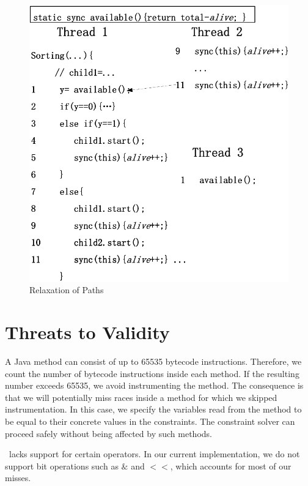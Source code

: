  


\begin{figure}[htp]
\centering
\includegraphics[scale=0.45]{figs/Visio-msort.pdf}
\caption{Relaxation of Paths}\label{fig:relax2}
\end{figure}


\section{Threats to Validity}
A Java method can consist of up to 65535 bytecode instructions. Therefore,
 we count the number of bytecode instructions inside each method. If the 
resulting number exceeds 65535, we avoid instrumenting the method. 
The consequence is that we will potentially miss races inside a method for 
which we skipped instrumentation. In this case, we specify the variables 
read from the method to be equal to their concrete values in the constraints. 
The constraint solver can proceed safely without being affected by 
such methods.

\tool\  lacks support for certain operators. In our current 
implementation, we do not support bit operations such as $\&$ and $<<$, which accounts for most of our misses.



